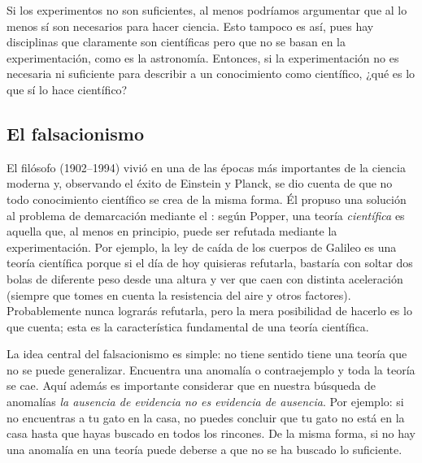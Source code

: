 Si los experimentos no son suficientes, al menos podríamos argumentar que al lo
menos sí son necesarios para hacer ciencia.
Esto tampoco es así, pues hay disciplinas que claramente son científicas pero
que no se basan en la experimentación, como es la astronomía.
Entonces, si la experimentación no es necesaria ni suficiente para describir a
un conocimiento como científico, ¿qué es lo que sí lo hace científico?

\subsection*{El falsacionismo}
\label{sub:elfalsacionismo}
El filósofo  (1902--1994) vivió en una de las
épocas más importantes de la ciencia moderna y, observando el éxito de Einstein
y Planck, se dio cuenta de que no todo conocimiento científico se crea de la
misma forma.
Él propuso una solución al problema de demarcación mediante el
:
según Popper, una teoría \emph{científica} es aquella que, al menos en
principio, puede ser refutada mediante la experimentación.
Por ejemplo, la ley de caída de los cuerpos de Galileo es una teoría científica
porque si el día de hoy quisieras refutarla, bastaría con soltar dos bolas de
diferente peso desde una altura y ver que caen con distinta aceleración (siempre
que tomes en cuenta la resistencia del aire y otros factores).
Probablemente nunca lograrás refutarla, pero la mera posibilidad de hacerlo es
lo que cuenta; esta es la característica fundamental de una teoría científica.

La idea central del falsacionismo es simple: no tiene sentido tiene una teoría
que no se puede generalizar.
Encuentra una anomalía o contraejemplo y toda la teoría se cae.
Aquí además es importante considerar que en nuestra búsqueda de anomalías
\emph{la ausencia de evidencia no es evidencia de ausencia}.
Por ejemplo: si no encuentras a tu gato en la casa, no puedes concluir que tu
gato no está en la casa hasta que hayas buscado en todos los rincones.
De la misma forma, si no hay una anomalía en una teoría puede deberse a que no
se ha buscado lo suficiente.

